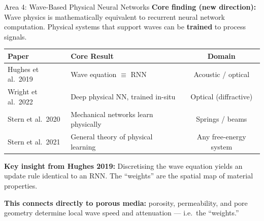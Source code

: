 \documentclass[aspectratio=169,11pt]{beamer}
\begin{document}
\begin{frame}{Area 4: Wave-Based Physical Neural Networks}
  \textbf{Core finding (new direction):} Wave physics is mathematically equivalent to recurrent neural network computation. Physical systems that support waves can be \textbf{trained} to process signals.

  \vspace{0.15cm}
  \begin{table}
    \centering
    \footnotesize
    \renewcommand{\arraystretch}{1.05}
    \begin{tabular}{@{}>{\raggedright}p{3cm}>{\raggedright}p{5.8cm}c@{}}
      \toprule
      \textbf{Paper} & \textbf{Core Result} & \textbf{Domain} \\
      \midrule
      Hughes et al.\ 2019 & Wave equation $\equiv$ RNN & Acoustic / optical \\
      Wright et al.\ 2022 & Deep physical NN, trained in-situ & Optical (diffractive) \\
      Stern et al.\ 2020 & Mechanical networks learn physically & Springs / beams \\
      Stern et al.\ 2021 & General theory of physical learning & Any free-energy system \\
      \bottomrule
    \end{tabular}
  \end{table}

  \vspace{0.1cm}
  {\small \textbf{Key insight from Hughes 2019:} Discretising the wave equation yields an update rule identical to an RNN. The ``weights'' are the spatial map of material properties.}

  \vspace{0.05cm}
  \textcolor{gdpDarkBlue}{\small \textbf{This connects directly to porous media:} porosity, permeability, and pore geometry determine local wave speed and attenuation --- i.e.\ the ``weights.''}
\end{frame}
\end{document}
